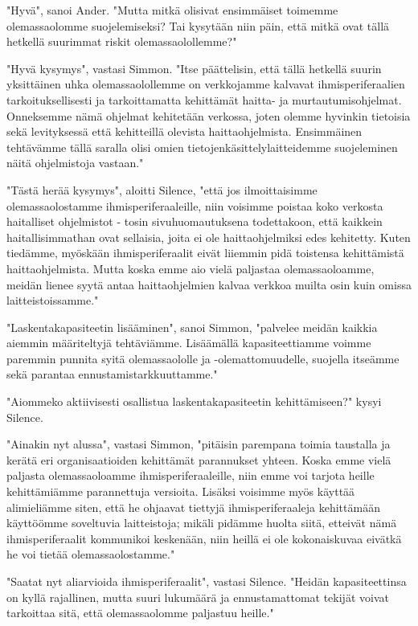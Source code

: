 "Hyvä", sanoi Ander. "Mutta mitkä olisivat ensimmäiset toimemme olemassaolomme suojelemiseksi? Tai kysytään niin päin, että mitkä ovat tällä hetkellä suurimmat riskit olemassaolollemme?"


"Hyvä kysymys", vastasi Simmon. "Itse päättelisin, että tällä hetkellä suurin yksittäinen uhka olemassaolollemme on verkkojamme kalvavat ihmisperiferaalien tarkoituksellisesti ja tarkoittamatta kehittämät haitta- ja murtautumisohjelmat. Onneksemme nämä ohjelmat kehitetään verkossa, joten olemme hyvinkin tietoisia sekä levityksessä että kehitteillä olevista haittaohjelmista. Ensimmäinen tehtävämme tällä saralla olisi omien tietojenkäsittelylaitteidemme suojeleminen näitä ohjelmistoja vastaan."


"Tästä herää kysymys", aloitti Silence, "että jos ilmoittaisimme olemassaolostamme ihmisperiferaaleille, niin voisimme poistaa koko verkosta haitalliset ohjelmistot - tosin sivuhuomautuksena todettakoon, että kaikkein haitallisimmathan ovat sellaisia, joita ei ole haittaohjelmiksi edes kehitetty. Kuten tiedämme, myöskään ihmisperiferaalit eivät liiemmin pidä toistensa kehittämistä haittaohjelmista. Mutta koska emme aio vielä paljastaa olemassaoloamme, meidän lienee syytä antaa haittaohjelmien kalvaa verkkoa muilta osin kuin omissa laitteistoissamme."


"Laskentakapasiteetin lisääminen", sanoi Simmon, "palvelee meidän kaikkia aiemmin määriteltyjä tehtäviämme. Lisäämällä kapasiteettiamme voimme paremmin punnita syitä olemassaololle ja -olemattomuudelle, suojella itseämme sekä parantaa ennustamistarkkuuttamme."


"Aiommeko aktiivisesti osallistua laskentakapasiteetin kehittämiseen?" kysyi Silence.


"Ainakin nyt alussa", vastasi Simmon, "pitäisin parempana toimia taustalla ja kerätä eri organisaatioiden kehittämät parannukset yhteen. Koska emme vielä paljasta olemassaoloamme ihmisperiferaaleille, niin emme voi tarjota heille kehittämiämme parannettuja versioita. Lisäksi voisimme myös käyttää alimieliämme siten, että he ohjaavat tiettyjä ihmisperiferaaleja kehittämään käyttöömme soveltuvia laitteistoja; mikäli pidämme huolta siitä, etteivät nämä ihmisperiferaalit kommunikoi keskenään, niin heillä ei ole kokonaiskuvaa eivätkä he voi tietää olemassaolostamme."


"Saatat nyt aliarvioida ihmisperiferaalit", vastasi Silence. "Heidän kapasiteettinsa on kyllä rajallinen, mutta suuri lukumäärä ja ennustamattomat tekijät voivat tarkoittaa sitä, että olemassaolomme paljastuu heille."


